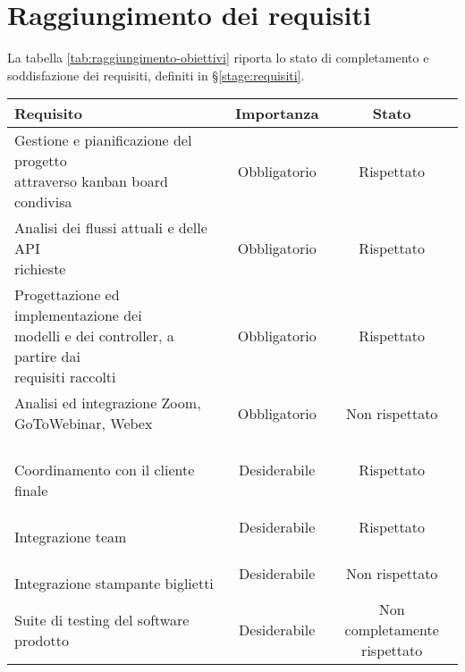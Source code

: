\section{Raggiungimento dei requisiti}
La tabella \ref{tab:raggiungimento-obiettivi} riporta lo stato di completamento e soddisfazione dei requisiti, definiti in \S \ref{stage:requisiti}.
\begin{table}[h]
	\centering
	\begin{tabularx}{\textwidth}{X|c|c}
		\rowcolor{white}
		\textbf{Requisito} & \textbf{Importanza} & \textbf{Stato} \\
		\hline
		\makecell[l]{Gestione e pianificazione del progetto \\ attraverso kanban board condivisa} & Obbligatorio & Rispettato \\
		\makecell[l]{Analisi dei flussi attuali e delle API \\ richieste} & Obbligatorio & Rispettato \\
		\makecell[l]{Progettazione ed implementazione dei \\ modelli e dei controller, a partire dai \\ requisiti raccolti} & Obbligatorio & Rispettato \\
		\makecell[l]{Analisi ed integrazione Zoom, \\ GoToWebinar, Webex} & Obbligatorio & Non rispettato \\
		\makecell[l]{\vspace{-6pt} \\ Coordinamento con il cliente finale \\ \vspace{-6pt}} & Desiderabile & Rispettato \\
		\makecell[l]{\vspace{-6pt} \\ Integrazione team \\ \vspace{-6pt}} & Desiderabile & Rispettato \\
		\makecell[l]{\vspace{-6pt} \\ Integrazione stampante biglietti \\ \vspace{-6pt}} & Desiderabile & Non rispettato \\
		Suite di testing del software prodotto & Desiderabile & \makecell{Non completamente \\ rispettato} \\

\end{tabularx}
\end{table}
